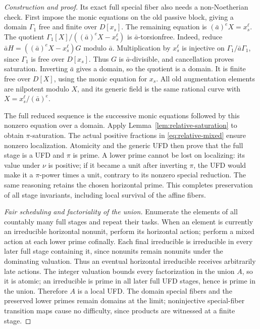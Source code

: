 \documentclass[10pt,a4paper]{amsart}
\begin{document}
\begin{proof}[Construction and proof]
Its exact full special fiber also needs a non-Noetherian check.
First impose the monic equations on the old passive block, giving
a domain \(\Gamma_1\) free and finite over \(D[x_s]\).  The
remaining equation is \((\bar a)^eX=x_s^\ell\).  The quotient
\(\Gamma_1[X]/((\bar a)^eX-x_s^\ell)\) is
\(\bar a\)-torsionfree.  Indeed, reduce
\(\bar a H=((\bar a)^eX-x_s^\ell)G\) modulo \(\bar a\).
Multiplication by \(x_s^\ell\) is injective on
\(\Gamma_1/\bar a\Gamma_1\), since \(\Gamma_1\) is free
over \(D[x_s]\).  Thus \(G\) is \(\bar a\)-divisible,
and cancellation proves saturation.  Inverting \(\bar a\)
gives a domain, so the quotient is a domain.  It is finite free
over \(D[X]\), using the monic equation for \(x_s\).  All old
augmentation elements are nilpotent modulo \(X\), and its
generic field is the same rational curve with
\(X=x_s^\ell/(\bar a)^e\).

The full reduced sequence is the successive monic equations
followed by this nonzero equation over a domain.  Apply
Lemma~\ref{lem:relative-saturation} to obtain \(\pi\)-saturation.
The actual positive fractions in \eqref{eq:relative-mixed} ensure
nonzero localization.  Atomicity and the generic UFD then prove
that the full stage is a UFD and \(\pi\) is prime.  A lower
prime cannot be lost on localizing: its value under \(\nu\) is
positive; if it became a unit after inverting \(\pi\), the UFD
would make it a \(\pi\)-power times a unit, contrary to its
nonzero special reduction.  The same reasoning retains the
chosen horizontal prime.  This completes preservation of all
stage invariants, including local survival of the affine fibers.

\smallskip\noindent\emph{Fair scheduling and factoriality of the union.}
Enumerate the elements of all countably many full stages and
repeat their tasks.  When an element is currently an irreducible
horizontal nonunit, perform its horizontal action; perform a
mixed action at each lower prime cofinally.  Each final
irreducible is irreducible in every later full stage containing
it, since nonunits remain nonunits under the dominating valuation.
Thus an eventual horizontal irreducible receives arbitrarily
late actions.  The integer valuation bounds every factorization
in the union \(A\), so it is atomic; an irreducible is prime
in all later full UFD stages, hence is prime in the union.
Therefore \(A\) is a local UFD.  The domain special fibers
and the preserved lower primes remain domains at the limit;
noninjective special-fiber transition maps cause no difficulty,
since products are witnessed at a finite stage.


\end{proof}
\end{document}

